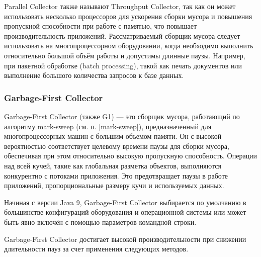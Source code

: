 Parallel Collector также называют Throughput Collector, так как он может использовать несколько процессоров для ускорения сборки мусора и повышения пропускной способности при работе с памятью, что повышает производительность приложений. \cite{java_gc_basics} Рассматриваемый сборщик мусора следует использовать на многопроцессорном оборудовании, когда необходимо выполнить относительно большой объём работы и допустимы длинные паузы. Например, при пакетной обработке (batch processing), такой как печать документов или выполнение большого количества запросов к базе данных. \cite{java_21_available_collectors}


\subsubsection{Garbage-First Collector}


Garbage-First Collector (также G1) --- это сборщик мусора, работающий по алгоритму mark-sweep (см. п. \ref{mark-sweep}), предназначенный для многопроцессорных машин с большим объемом памяти. Он с высокой вероятностью соответствует целевому времени паузы для сборки мусора, обеспечивая при этом относительно высокую пропускную способность. Операции над всей кучей, такие как глобальная разметка объектов, выполняются конкурентно с потоками приложения. Это предотвращает паузы в работе приложений, пропорциональные размеру кучи и используемых данных. \cite{java_g1}

Начиная с версии Java 9, Garbage-First Collector выбирается по умолчанию в большинстве конфигураций оборудования и операционной системы или может быть явно включён с помощью параметров командной строки. \cite{java_g1}

Garbage-First Collector достигает высокой производительности при снижении длительности пауз за счет применения следующих методов. \cite{java_g1}

